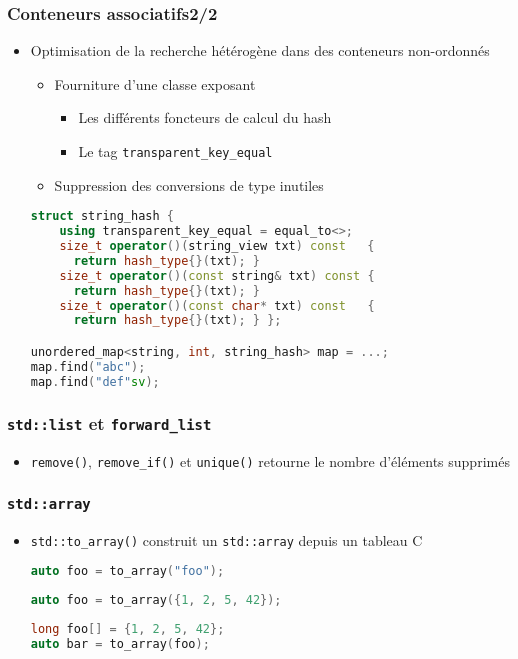\documentclass[C++.tex]{subfiles}
\begin{document}
\begin{frame}[fragile]
	\frametitle{Conteneurs associatifs\titlehfill{}2/2}
	\begin{itemize}
		\item Optimisation de la recherche hétérogène dans des conteneurs non-ordonnés
		\begin{itemize}
			\item Fourniture d'une classe exposant
			\begin{itemize}
				\item Les différents foncteurs de calcul du hash
				\item Le tag \lstinline|transparent_key_equal|
			\end{itemize}
			\item Suppression des conversions de type inutiles
		\end{itemize}

		\begin{lstlisting}[language=C++]
struct string_hash {
	using transparent_key_equal = equal_to<>;
	size_t operator()(string_view txt) const   { 
	  return hash_type{}(txt); }
	size_t operator()(const string& txt) const {
	  return hash_type{}(txt); }
	size_t operator()(const char* txt) const   {
	  return hash_type{}(txt); } };

unordered_map<string, int, string_hash> map = ...;
map.find("abc");
map.find("def"sv);\end{lstlisting}
	\end{itemize}
\end{frame}

\begin{frame}[fragile]
	\frametitle{\lstinline|std::list| et \lstinline|forward_list|}
	\begin{itemize}
		\item \lstinline|remove()|, \lstinline|remove_if()| et \lstinline|unique()| retourne le nombre d'éléments supprimés
	\end{itemize}
\end{frame}

\begin{frame}[fragile]
	\frametitle{\lstinline|std::array|}
	\begin{itemize}
		\item \lstinline|std::to_array()| construit un \lstinline|std::array| depuis un tableau C

		\begin{lstlisting}[language=C++]
auto foo = to_array("foo");\end{lstlisting}

	\begin{lstlisting}[language=C++]
auto foo = to_array({1, 2, 5, 42});\end{lstlisting}

	\begin{lstlisting}[language=C++]
long foo[] = {1, 2, 5, 42};
auto bar = to_array(foo);\end{lstlisting}

	\end{itemize}
\end{frame}
\end{document}
